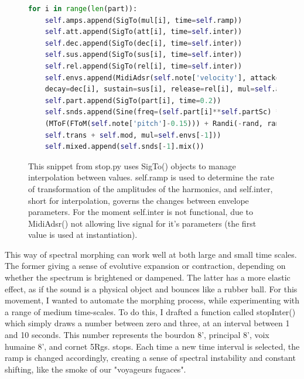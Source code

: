 \documentclass[12pt,twoside,maitrise]{dms_ks}
\theoremstyle{definition}
\begin{document}
\begin{figure}[H]
\begin{lstlisting}[language=Python]
for i in range(len(part)):
    self.amps.append(SigTo(mul[i], time=self.ramp))
    self.att.append(SigTo(att[i], time=self.inter))
    self.dec.append(SigTo(dec[i], time=self.inter))
    self.sus.append(SigTo(sus[i], time=self.inter))
    self.rel.append(SigTo(rel[i], time=self.inter))
    self.envs.append(MidiAdsr(self.note['velocity'], attack=att[i],
    decay=dec[i], sustain=sus[i], release=rel[i], mul=self.amps[-1]))
    self.part.append(SigTo(part[i], time=0.2))
    self.snds.append(Sine(freq=(self.part[i]**self.partSc) * 
    (MToF(FToM(self.note['pitch']-0.15))) + Randi(-rand, rand, 5) + 
    self.trans + self.mod, mul=self.envs[-1]))
    self.mixed.append(self.snds[-1].mix())
\end{lstlisting}
\caption{This snippet from stop.py uses SigTo() objects to manage interpolation between values.
self.ramp is used to determine the rate of transformation of the amplitudes of the harmonics, and self.inter, short for interpolation, governs the changes between envelope parameters.
For the moment self.inter is not functional, due to MidiAdsr() not allowing live signal for it's parameters (the first value is used at instantiation).} 
\end{figure}

This way of spectral morphing can work well at both large and small time scales.
The former giving a sense of evolutive expansion or contraction, depending on whether the spectrum is brightened or dampened.
The latter has a more elastic effect, as if the sound is a physical object and bounces like a rubber ball.
For this movement, I wanted to automate the morphing process, while experimenting with a range of medium time-scales.
To do this, I drafted a function called stopInter() which simply draws a number between zero and three, at an interval between 1 and 10 seconds.
This number represents the bourdon 8', principal 8', voix humaine 8', and cornet 5Rgs.
stops.
Each time a new time interval is selected, the ramp is changed accordingly, creating a sense of spectral instability and constant shifting, like the smoke of our "voyageurs fugaces".
\end{document}
